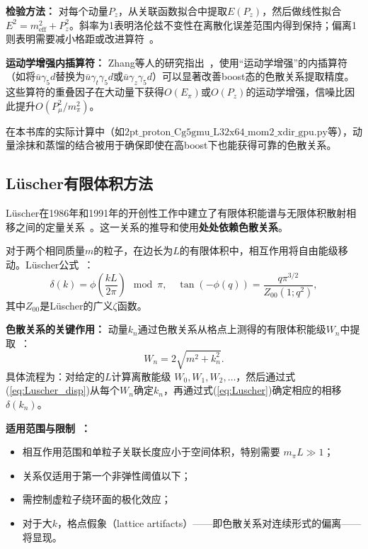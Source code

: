 \documentclass[12pt,a4paper]{ctexart}
\theoremstyle{definition}
\begin{document}
\textbf{检验方法：} 对每个动量$P_z$，从关联函数拟合中提取$E(P_z)$，然后做线性拟合 $E^2 = m_{\text{eff}}^2 + P_z^2$。斜率为1表明洛伦兹不变性在离散化误差范围内得到保持；偏离1则表明需要减小格距或改进算符~\cite{hadronSpectroscopy2026,KinematicallyEnhanced2015}。

\textbf{运动学增强内插算符：} Zhang等人的研究指出~\cite{KinematicallyEnhanced2015}，使用``运动学增强''的内插算符（如将$\bar{u}\gamma_5 d$替换为$\bar{u}\gamma_t\gamma_5 d$或$\bar{u}\gamma_z\gamma_5 d$）可以显著改善boost态的色散关系提取精度。这些算符的重叠因子在大动量下获得$O(E_\pi)$或$O(P_z)$的运动学增强，信噪比因此提升$O(P_\mu^2/m_\pi^2)$。

在本书库的实际计算中（如$2\text{pt\_proton\_Cg5gmu\_L32x64\_mom2\_xdir\_gpu.py}$等），动量涂抹和蒸馏的结合被用于确保即使在高boost下也能获得可靠的色散关系。

\subsection{L\"uscher有限体积方法}

L\"uscher在1986年和1991年的开创性工作中建立了有限体积能谱与无限体积散射相移之间的定量关系~\cite{GattringerLang2010}。这一关系的推导和使用\textbf{处处依赖色散关系}。

对于两个相同质量$m$的粒子，在边长为$L$的有限体积中，相互作用将自由能级移动。L\"uscher公式~\cite{GattringerLang2010}：
\begin{equation}\label{eq:Luscher}
    \delta(k) = \phi\left(\frac{kL}{2\pi}\right) \mod \pi, \quad \tan(-\phi(q)) = \frac{q\pi^{3/2}}{Z_{00}(1; q^2)},
\end{equation}
其中$Z_{00}$是L\"uscher的广义$\zeta$函数。

\textbf{色散关系的关键作用：} 动量$k_n$通过色散关系从格点上测得的有限体积能级$W_n$中提取~\cite{GattringerLang2010}：
\begin{equation}\label{eq:Luscher_disp}
    W_n = 2\sqrt{m^2 + k_n^2}.
\end{equation}
具体流程为：对给定的$L$计算离散能级 $W_0, W_1, W_2, \ldots$，然后通过式(\ref{eq:Luscher_disp})从每个$W_n$确定$k_n$，再通过式(\ref{eq:Luscher})确定相应的相移 $\delta(k_n)$。

\textbf{适用范围与限制~\cite{GattringerLang2010}：}
\begin{itemize}
    \item 相互作用范围和单粒子关联长度应小于空间体积，特别需要 $m_\pi L \gg 1$；
    \item 关系仅适用于第一个非弹性阈值以下；
    \item 需控制虚粒子绕环面的极化效应；
    \item 对于大$k$，格点假象（lattice artifacts）——即色散关系对连续形式的偏离——将显现。
\end{itemize}
\end{document}
